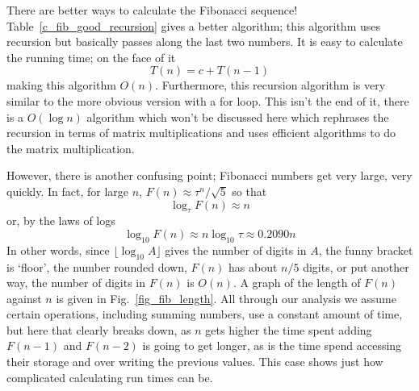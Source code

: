 \documentclass[11pt,a4paper]{scrartcl}
\begin{document}
There are better ways to calculate the Fibonacci sequence!
Table~\ref{c_fib_good_recursion} gives a better algorithm; this
algorithm uses recursion but basically passes along the last two
numbers. It is easy to calculate the running time; on the face of it
\begin{equation}
T(n)=c+T(n-1)
\end{equation}
making this algorithm $O(n)$. Furthermore, this recursion algorithm is
very similar to the more obvious version with a for loop. This isn't
the end of it, there is a $O(\log{n})$ algorithm which won't be
discussed here which rephrases the recursion in terms of matrix
multiplications and uses efficient algorithms to do the matrix
multiplication. 

However, there is another confusing point; Fibonacci numbers get very
large, very quickly. In fact, for large $n$, $F(n)\approx
\tau^n/\sqrt{5}$ so that
\begin{equation}
\log_\tau F(n)\approx n
\end{equation}
or, by the laws of logs
\begin{equation}
\log_{10} F(n) \approx n\log_{10}\tau \approx 0.2090 n
\end{equation}
In other words, since $\lfloor \log_{10} A\rfloor$ gives the number of
digits in $A$, the funny bracket is \lq{}floor\rq{}, the number
rounded down, $F(n)$ has about $n/5$ digits, or put another way, the
number of digits in $F(n)$ is $O(n)$. A graph of the length of $F(n)$
against $n$ is given in Fig.~\ref{fig_fib_length}. All through our
analysis we assume certain operations, including summing numbers, use
a constant amount of time, but here that clearly breaks down, as $n$
gets higher the time spent adding $F(n-1)$ and $F(n-2)$ is going to
get longer, as is the time spend accessing their storage and over
writing the previous values. This case shows just how complicated
calculating run times can be.
\end{document}
